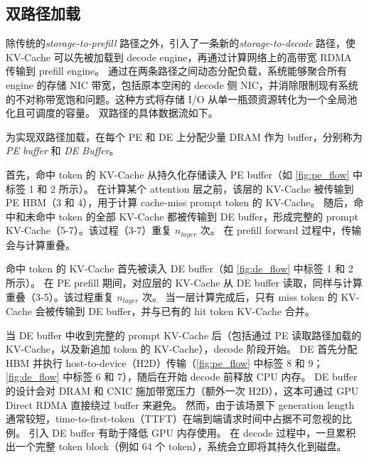 \subsection{双路径加载}
\label{sec:dual-path-loading}

除传统的\emph{storage-to-prefill} 路径之外，\sysname 引入了一条新的\emph{storage-to-decode} 路径，使 KV-Cache 可以先被加载到 decode engine，再通过计算网络上的高带宽 RDMA 传输到 prefill engine。
通过在两条路径之间动态分配负载，系统能够聚合所有 engine 的存储 NIC 带宽，包括原本空闲的 decode 侧 NIC，并消除限制现有系统的不对称带宽饱和问题。这种方式将存储 I/O 从单一瓶颈资源转化为一个全局池化且可调度的容量。%
双路径的具体数据流如下。

为实现双路径加载，\sysname 在每个 PE 和 DE 上分配少量 DRAM 作为 buffer，分别称为 \emph{PE buffer} 和 \emph{DE Buffer}。

首先，命中 token 的 KV-Cache 从持久化存储读入 PE buffer（如 \autoref{fig:pe_flow} 中标签 1 和 2 所示）。
在计算某个 attention 层之前，该层的 KV-Cache 被传输到 PE HBM（3 和 4），用于计算 cache-miss prompt token 的 KV-Cache。
随后，命中和未命中 token 的全部 KV-Cache 都被传输到 DE buffer，形成完整的 prompt KV-Cache（5-7）。该过程（3-7）重复 $n_{layer}$ 次。
在 prefill forward 过程中，传输会与计算重叠。

 命中 token 的 KV-Cache 首先被读入 DE buffer（如 \autoref{fig:de_flow} 中标签 1 和 2 所示）。
在 PE prefill 期间，对应层的 KV-Cache 从 DE buffer 读取，同样与计算重叠（3-5）。该过程重复 $n_{layer}$ 次。
当一层计算完成后，只有 miss token 的 KV-Cache 会被传输到 DE buffer，并与已有的 hit token KV-Cache 合并。

 当 DE buffer 中收到完整的 prompt KV-Cache 后（包括通过 PE 读取路径加载的 KV-Cache，以及新追加 token 的 KV-Cache），decode 阶段开始。
DE 首先分配 HBM 并执行 host-to-device（H2D）传输（\autoref{fig:pe_flow} 中标签 8 和 9；\autoref{fig:de_flow} 中标签 6 和 7），随后在开始 decode 前释放 CPU 内存。
DE buffer 的设计会对 DRAM 和 CNIC 施加带宽压力（额外一次 H2D），这本可通过 GPU Direct RDMA 直接绕过 buffer 来避免。
然而，由于该场景下 generation length 通常较短，time-to-first-token（TTFT）在端到端请求时间中占据不可忽视的比例。
引入 DE buffer 有助于降低 GPU 内存使用。
在 decode 过程中，一旦累积出一个完整 token block（例如 64 个 token），系统会立即将其持久化到磁盘。

